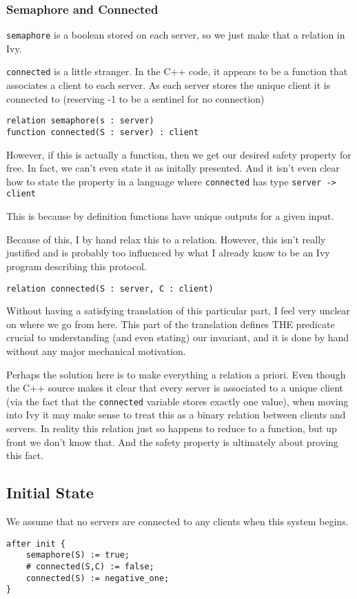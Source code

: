 \documentclass[11pt]{article}
\begin{document}
\subsubsection{Semaphore and Connected}
\label{sec:org8d0dc9b}
\texttt{semaphore} is a boolean stored on each server, so we just make that a relation in Ivy.

\texttt{connected} is a little stranger. In the C++ code, it appears to be a function that associates a client to each server. As each server stores the unique client it is connected to (reserving -1 to be a sentinel for no connection)
\begin{verbatim}
relation semaphore(s : server)
function connected(S : server) : client
\end{verbatim}

However, if this is actually a function, then we get our desired safety property for free. In fact, we can't even state it as initally presented. And it isn't even clear how to state the property in a language where \texttt{connected} has type \texttt{server -> client}

This is because by definition functions have unique outputs for a given input.

Because of this, I by hand relax this to a relation. However, this isn't really justified and is probably too influenced by what I already know to be an Ivy program describing this protocol.

\begin{verbatim}
relation connected(S : server, C : client)
\end{verbatim}

Without having a satisfying translation of this particular part, I feel very unclear on where we go from here. This part of the translation defines THE predicate crucial to understanding (and even stating) our invariant, and it is done by hand without any major mechanical motivation.

Perhaps the solution here is to make everything a relation a priori. Even though the C++ source makes it clear that every server is associated to a unique client (via the fact that the \texttt{connected} variable stores exactly one value), when moving into Ivy it may make sense to treat this as a binary relation between clients and servers. In reality this relation just so happens to reduce to a function, but up front we don't know that. And the safety property is ultimately about proving this fact.
\subsection{Initial State}
\label{sec:orgf4d9f8a}
We assume that no servers are connected to any clients when this system begins.
\begin{verbatim}
after init {
    semaphore(S) := true;
    # connected(S,C) := false;
    connected(S) := negative_one;
}
\end{verbatim}
\end{document}
